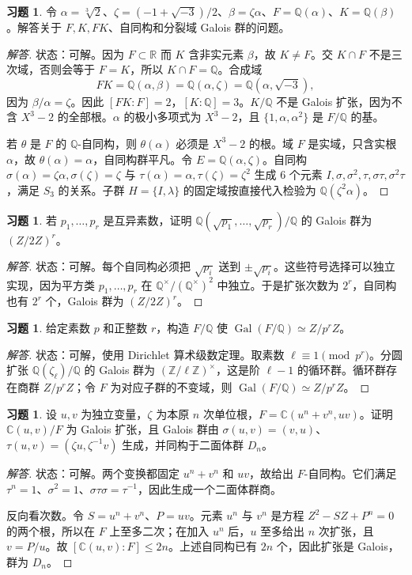\documentclass[11pt,a4paper,openany]{ctexbook}
\numberwithin{equation}{chapter}
\newcommand{\Q}{\mathbb{Q}}
\newcommand{\R}{\mathbb{R}}
\newcommand{\C}{\mathbb{C}}
\newcommand{\Z}{\mathbb{Z}}
\newcommand{\Gal}{\operatorname{Gal}}
\theoremstyle{plain}
\theoremstyle{definition}
\newtheorem{exercise}[theorem]{习题}
\theoremstyle{remark}
\begin{document}
\begin{exercise}
令 $\alpha=\sqrt[3]{2}$、$\zeta=(-1+\sqrt{-3})/2$、$\beta=\zeta\alpha$、$F=\Q(\alpha)$、$K=\Q(\beta)$。解答关于 $F,K,FK$、自同构和分裂域 Galois 群的问题。
\end{exercise}
\begin{proof}[解答]
状态：可解。因为 $F\subset\R$ 而 $K$ 含非实元素 $\beta$，故 $K\ne F$。交 $K\cap F$ 不是三次域，否则会等于 $F=K$，所以 $K\cap F=\Q$。合成域
\[
FK=\Q(\alpha,\beta)=\Q(\alpha,\zeta)=\Q(\alpha,\sqrt{-3}),
\]
因为 $\beta/\alpha=\zeta$。因此 $[FK:F]=2$，$[K:\Q]=3$。$K/\Q$ 不是 Galois 扩张，因为不含 $X^3-2$ 的全部根。$\alpha$ 的极小多项式为 $X^3-2$，且 $\{1,\alpha,\alpha^2\}$ 是 $F/\Q$ 的基。

若 $\theta$ 是 $F$ 的 $\Q$-自同构，则 $\theta(\alpha)$ 必须是 $X^3-2$ 的根。域 $F$ 是实域，只含实根 $\alpha$，故 $\theta(\alpha)=\alpha$，自同构群平凡。令 $E=\Q(\alpha,\zeta)$。自同构 $\sigma(\alpha)=\zeta\alpha,\sigma(\zeta)=\zeta$ 与 $\tau(\alpha)=\alpha,\tau(\zeta)=\zeta^2$ 生成 $6$ 个元素 $I,\sigma,\sigma^2,\tau,\sigma\tau,\sigma^2\tau$，满足 $S_3$ 的关系。子群 $H=\{I,\lambda\}$ 的固定域按直接代入检验为 $\Q(\zeta^2\alpha)$。
\end{proof}

\begin{exercise}
若 $p_1,\dots,p_r$ 是互异素数，证明 $\Q(\sqrt{p_1},\dots,\sqrt{p_r})/\Q$ 的 Galois 群为 $(Z/2Z)^r$。
\end{exercise}
\begin{proof}[解答]
状态：可解。每个自同构必须把 $\sqrt{p_i}$ 送到 $\pm\sqrt{p_i}$。这些符号选择可以独立实现，因为平方类 $p_1,\dots,p_r$ 在 $\Q^\times/(\Q^\times)^2$ 中独立。于是扩张次数为 $2^r$，自同构也有 $2^r$ 个，Galois 群为 $(Z/2Z)^r$。
\end{proof}

\begin{exercise}
给定素数 $p$ 和正整数 $r$，构造 $F/\Q$ 使 $\Gal(F/\Q)\simeq Z/p^rZ$。
\end{exercise}
\begin{proof}[解答]
状态：可解，使用 Dirichlet 算术级数定理。取素数 $\ell\equiv1\pmod{p^r}$。分圆扩张 $\Q(\zeta_\ell)/\Q$ 的 Galois 群为 $(\Z/\ell\Z)^\times$，这是阶 $\ell-1$ 的循环群。循环群存在商群 $Z/p^rZ$；令 $F$ 为对应子群的不变域，则 $\Gal(F/\Q)\simeq Z/p^rZ$。
\end{proof}

\begin{exercise}
设 $u,v$ 为独立变量，$\zeta$ 为本原 $n$ 次单位根，$F=\C(u^n+v^n,uv)$。证明 $\C(u,v)/F$ 为 Galois 扩张，且 Galois 群由 $\sigma(u,v)=(v,u)$、$\tau(u,v)=(\zeta u,\zeta^{-1}v)$ 生成，并同构于二面体群 $D_n$。
\end{exercise}
\begin{proof}[解答]
状态：可解。两个变换都固定 $u^n+v^n$ 和 $uv$，故给出 $F$-自同构。它们满足 $\tau^n=1$、$\sigma^2=1$、$\sigma\tau\sigma=\tau^{-1}$，因此生成一个二面体群商。

反向看次数。令 $S=u^n+v^n$、$P=uv$。元素 $u^n$ 与 $v^n$ 是方程 $Z^2-SZ+P^n=0$ 的两个根，所以在 $F$ 上至多二次；在加入 $u^n$ 后，$u$ 至多给出 $n$ 次扩张，且 $v=P/u$。故 $[\C(u,v):F]\le2n$。上述自同构已有 $2n$ 个，因此扩张是 Galois，群为 $D_n$。
\end{proof}
\end{document}
